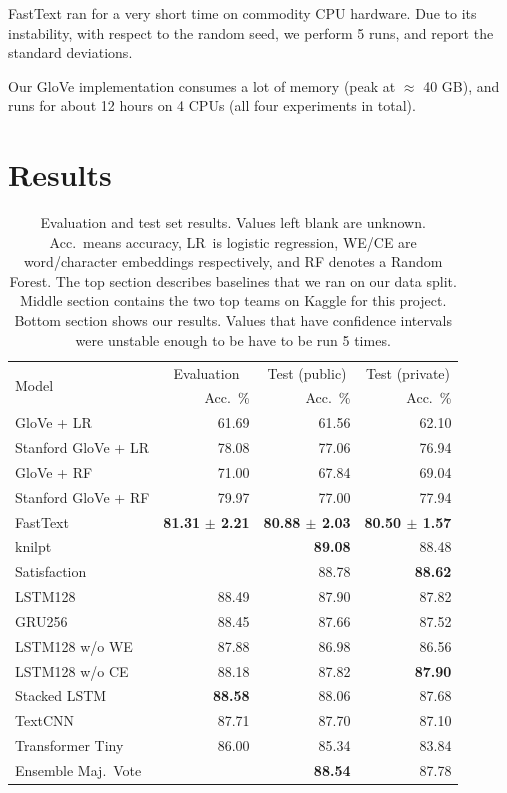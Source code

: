 \documentclass[10pt,conference,compsocconf]{IEEEtran}
\begin{document}
FastText ran for a very short time on commodity CPU hardware.
Due to its instability, with respect to the random seed,
we perform 5 runs, and report the standard deviations. 

Our GloVe implementation consumes a lot of memory (peak at $\approx$ 40 GB), and runs for about 12 hours on 4 CPUs (all four experiments in total).

\section{Results}

\begin{table}\centering
\begin{tabular}{lrrr}
\toprule
\multirow{2}{*}{Model} & \multicolumn{1}{c}{Evaluation} & \multicolumn{1}{c}{Test (public)} & \multicolumn{1}{c}{Test (private)}\\
& Acc.~\% & Acc.~\% & Acc.~\%\\
\midrule
GloVe + LR & 61.69 & 61.56 & 62.10\\
Stanford GloVe + LR & 78.08 & 77.06 & 76.94\\
GloVe + RF & 71.00 & 67.84 & 69.04\\
Stanford GloVe + RF & 79.97 & 77.00 & 77.94\\
FastText \cite{joulin2017bag} & \textbf{81.31} \textbf{$\pm$ 2.21} & \textbf{80.88 $\pm$ 2.03}& \textbf{80.50 $\pm$ 1.57}\\
\midrule
knilpt &  & \textbf{89.08} & 88.48\\
Satisfaction &  & 88.78 & \textbf{88.62}\\
\midrule
LSTM128 & 88.49 & 87.90 & 87.82\\
GRU256 & 88.45 & 87.66 & 87.52\\
LSTM128 w/o WE & 87.88 & 86.98 & 86.56\\
LSTM128 w/o CE & 88.18 & 87.82 & \textbf{87.90}\\
Stacked LSTM & \textbf{88.58} & 88.06 & 87.68\\
TextCNN & 87.71 & 87.70 & 87.10\\
Transformer Tiny & 86.00 & 85.34 & 83.84\\
Ensemble Maj.~Vote & & \textbf{88.54} & 87.78\\
\bottomrule
\end{tabular}
\caption{Evaluation and test set results. Values left blank are unknown. Acc.~means accuracy, LR~is logistic regression, WE/CE are word/character embeddings respectively, and RF denotes a Random Forest. The top section describes baselines that we ran on our data split. Middle section contains the two top teams on Kaggle for this project. Bottom section shows our results. Values that have confidence intervals were unstable enough to be have to be run 5 times.}\label{tab:results}
\end{table}
\end{document}
